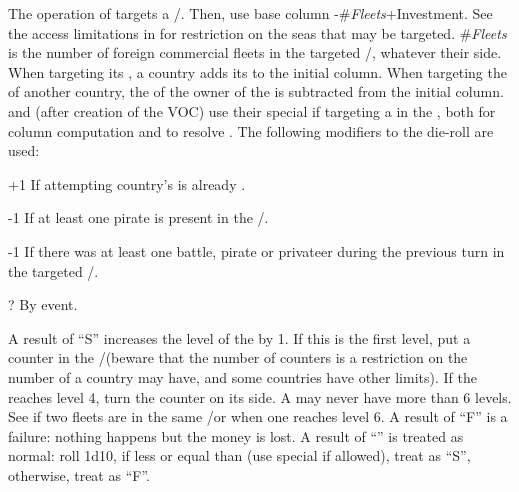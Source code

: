  The operation of 
targets a \STZ/\CTZ. Then, use base column
\FTI-\#\emph{Fleets}+Investment.%
\bparag See the access limitations in  for
restriction on the seas that may be targeted.
\bparag \#\emph{Fleets} is the number of foreign commercial fleets in the
targeted \STZ/\CTZ, whatever their side.
\bparag When targeting its \CTZ, a country adds its \DTI to the initial
column.
\bparag When targeting the \CTZ of another country, the \DTI of the owner of
the \CTZ is subtracted from the initial column.
\bparag \POR and \HOL (after creation of the VOC) use their special \FTI if
targeting a \STZ in the \ROTW, both for column computation and to resolve
\undemi.
\bparag The following modifiers to the die-roll are used:
\begin{modlist}
\item[+1]If attempting country's \TradeFLEET is already \Faceplus.
\item[-1]If at least one pirate is present in the \STZ/\CTZ.%
\item[-1]If there was at least one battle, pirate or privateer during the
  previous turn in the targeted \STZ/\CTZ.
\item[\textplusminus?]By event.
\end{modlist}

\bparag A result of ``S'' increases the level of the \TradeFLEET by 1. If this
is the first level, put a counter in the \STZ/\CTZ (beware that the number of
counters is a restriction on the number of \TradeFLEET a country may have, and
some countries have other limits). If the \TradeFLEET reaches level 4, turn
the counter on its \Faceplus side. A \TradeFLEET may never have more than 6
levels.
\bparag See  if two fleets are
\Faceplus in the same \STZ/\CTZ or when one \TradeFLEET reaches level 6.
\bparag A result of ``F'' is a failure: nothing happens but the money is lost.
\bparag A result of ``\undemi'' is treated as normal: roll 1d10, if less or
equal than \FTI (use special \FTI if allowed), treat as ``S'', otherwise,
treat as ``F''.

